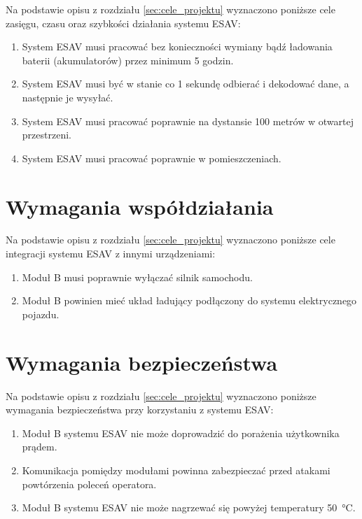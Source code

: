 Na podstawie opisu z rozdziału \ref{sec:cele_projektu} wyznaczono poniższe cele zasięgu, czasu oraz szybkości działania systemu ESAV:

\begin{enumerate}[label=\thesection.\arabic{*}.,leftmargin=4em]
\item \label{wym_uzyt1} System ESAV musi pracować bez konieczności wymiany bądź ładowania baterii (akumulatorów) przez minimum 5 godzin.
\item \label{wym_uzyt2} System ESAV musi być w stanie co 1 sekundę odbierać i dekodować dane, a następnie je wysyłać.
\item \label{wym_uzyt3} System ESAV musi pracować poprawnie na dystansie 100 metrów w otwartej przestrzeni.
\item \label{wym_uzyt4} System ESAV musi pracować poprawnie w pomieszczeniach.
\end{enumerate}


\section{Wymagania współdziałania}
\label{sec:wymagania_wspoldzialania}

Na podstawie opisu z rozdziału \ref{sec:cele_projektu} wyznaczono poniższe cele integracji systemu ESAV z innymi urządzeniami:

\begin{enumerate}[label=\thesection.\arabic{*}.,leftmargin=4em]
\item \label{wym_wsp1} Moduł B musi poprawnie wyłączać silnik samochodu.
\item \label{wym_wsp2} Moduł B powinien mieć układ ładujący podłączony do systemu elektrycznego pojazdu.
\end{enumerate}


\section{Wymagania bezpieczeństwa}
\label{sec:wymagania_bezpieczenstwa}

Na podstawie opisu z rozdziału \ref{sec:cele_projektu} wyznaczono poniższe wymagania bezpieczeństwa przy korzystaniu z systemu ESAV:
\begin{enumerate}[label=\thesection.\arabic{*}.,leftmargin=4em]
\item \label{wym_bezp1} Moduł B systemu ESAV nie może doprowadzić do porażenia użytkownika prądem.
\item \label{wym_bezp2} Komunikacja pomiędzy modułami powinna zabezpieczać przed atakami powtórzenia poleceń operatora.
\item \label{wym_bezp3} Moduł B systemu ESAV nie może nagrzewać się powyżej temperatury \SI{50}{\celsius}.
\end{enumerate}

